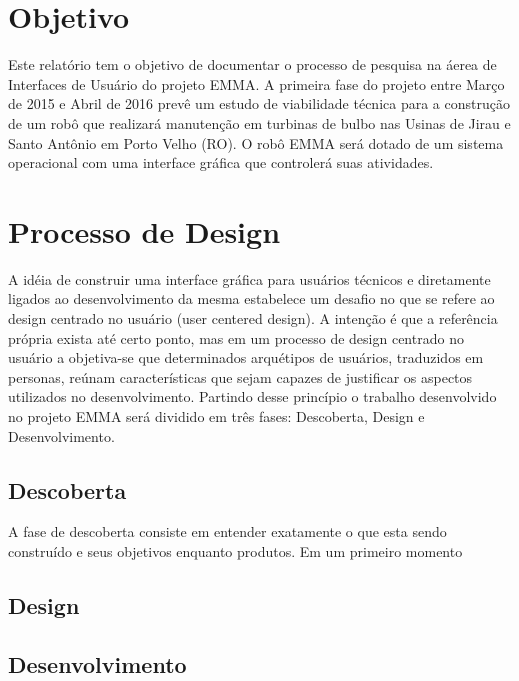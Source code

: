 \documentclass[12pt,a4paper]{article}
\begin{document}


\tableofcontents



\section{Objetivo}

Este relatório tem o objetivo de documentar o processo de pesquisa na áerea de
Interfaces de Usuário do projeto EMMA. A primeira fase do projeto entre Março de
2015 e Abril de 2016 prevê um estudo de viabilidade técnica para a construção de
um robô que realizará manutenção em turbinas de bulbo nas Usinas de Jirau e
Santo Antônio em Porto Velho (RO). O robô EMMA será dotado de um sistema
operacional com uma interface gráfica que controlerá suas atividades.

\section{Processo de Design}

A idéia de construir uma interface gráfica para usuários 
técnicos e diretamente ligados ao desenvolvimento da mesma estabelece um desafio
no que se refere ao design centrado no usuário (user centered design). A
intenção é que a referência própria exista até certo ponto, mas em um processo
de design centrado no usuário a objetiva-se que determinados arquétipos de
usuários, traduzidos em personas, reúnam características que sejam capazes de
justificar os aspectos utilizados no desenvolvimento. Partindo desse princípio o
trabalho desenvolvido no projeto EMMA será dividido em três fases: Descoberta, Design e Desenvolvimento.


\subsection{Descoberta}

A fase de descoberta consiste em entender exatamente o que esta sendo construído
e seus objetivos enquanto produtos. Em um primeiro momento 

\subsection{Design}

\subsection{Desenvolvimento}
\end{document}
